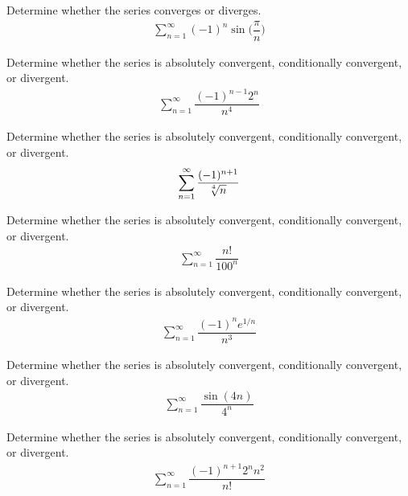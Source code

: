 \begin{exercise}
Determine whether the series converges or diverges.
\begin{align*}
    \sum_{n=1}^{\infty} (-1)^{n}\sin\Big(\dfrac{\pi}{n}\Big)
\end{align*}
\end{exercise}

\begin{exercise}
Determine whether the series is absolutely convergent, conditionally convergent, or divergent.
\begin{align*}
    \sum_{n=1}^{\infty} \dfrac{(-1)^{n-1}2^{n}}{n^{4}}
\end{align*}
\end{exercise}

\begin{exercise}
Determine whether the series is absolutely convergent, conditionally convergent, or divergent.
\begin{align*}
    \sum_{n=1}^{\infty} \dfrac{(-1)^{n+1}}{\sqrt[\leftroot{2}\uproot{2}4]{n}}
\end{align*}
\end{exercise}

\begin{exercise}
Determine whether the series is absolutely convergent, conditionally convergent, or divergent.
\begin{align*}
    \sum_{n=1}^{\infty} \dfrac{n!}{100^{n}}
\end{align*}
\end{exercise}

\begin{exercise}
Determine whether the series is absolutely convergent, conditionally convergent, or divergent.
\begin{align*}
    \sum_{n=1}^{\infty} \dfrac{(-1)^{n}e^{1/n}}{n^{3}}
\end{align*}
\end{exercise}

\begin{exercise}
Determine whether the series is absolutely convergent, conditionally convergent, or divergent.
\begin{align*}
    \sum_{n=1}^{\infty} \dfrac{\sin(4n)}{4^{n}}
\end{align*}
\end{exercise}

\begin{exercise}
Determine whether the series is absolutely convergent, conditionally convergent, or divergent.
\begin{align*}
    \sum_{n=1}^{\infty} \dfrac{(-1)^{n+1}2^{n}n^{2}}{n!}
\end{align*}
\end{exercise}


